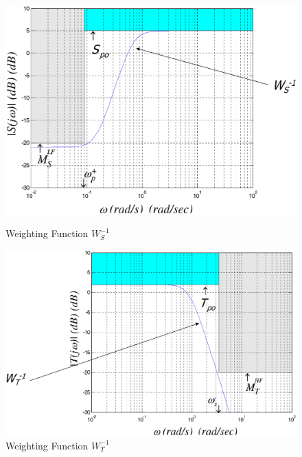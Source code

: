 \documentclass[a4paper,10pt,titlepage]{article}
\numberwithin{equation}{subsection}
\begin{document}
	\begin{figure}[htbp]
		\centering
		\begin{minipage}{0.45\textwidth} %
			\centering
			\includegraphics[width=\linewidth]{images/Approximation_W_S.png}
			\caption{Weighting Function $W_S^{-1}$}
			\label{fig:image2}
		\end{minipage}
		\hfill %
		\vrule width 0.5pt %
		\hfill %
		\begin{minipage}{0.45\textwidth} %
			\centering
			\vspace{0pt}
			\includegraphics[width=1.135\linewidth]{images/Approximation_W_T.png}
			\caption{Weighting Function $W_T^{-1}$}
			\label{fig:image3}
		\end{minipage}
	\end{figure}
	
\end{document}
